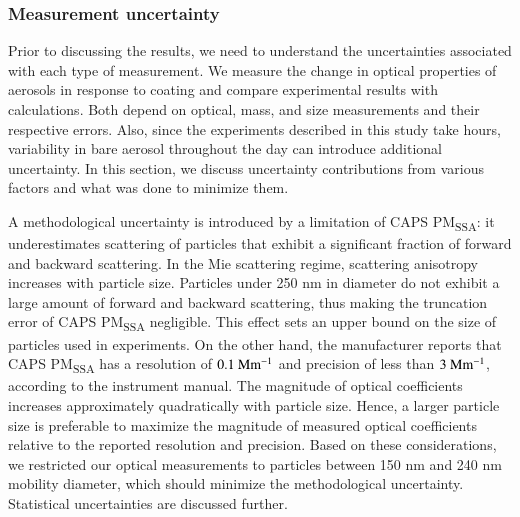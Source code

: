 \label{sec:optical}

\subsubsection{Measurement uncertainty}

\label{sec:uncertainty}

Prior to discussing the results, we need to understand the uncertainties associated with each type of measurement. We measure the change in optical properties of aerosols in response to coating and compare experimental results with calculations. Both depend on optical, mass, and size measurements and their respective errors. Also, since the experiments described in this study take hours, variability in bare aerosol throughout the day can introduce additional uncertainty. In this section, we discuss uncertainty contributions from various factors and what was done to minimize them.

A methodological uncertainty is introduced by a limitation of CAPS PM\textsubscript{SSA}: it underestimates scattering of particles that exhibit a significant fraction of forward and backward scattering. In the Mie scattering regime, scattering anisotropy increases with particle size. Particles under 250 nm in diameter do not exhibit a large amount of forward and backward scattering, thus making the truncation error of CAPS PM\textsubscript{SSA} negligible. This effect sets an upper bound on the size of particles used in experiments. On the other hand, the manufacturer reports that CAPS PM\textsubscript{SSA} has a resolution of $0.1\rm\ Mm^{-1}$ and precision of less than $3\rm\ Mm^{-1}$, according to the instrument manual. The magnitude of optical coefficients increases approximately quadratically with particle size. Hence, a larger particle size is preferable to maximize the magnitude of measured optical coefficients relative to the reported resolution and precision. Based on these considerations, we restricted our optical measurements to particles between 150 nm and 240 nm mobility diameter, which should minimize the methodological uncertainty. Statistical uncertainties are discussed further.

